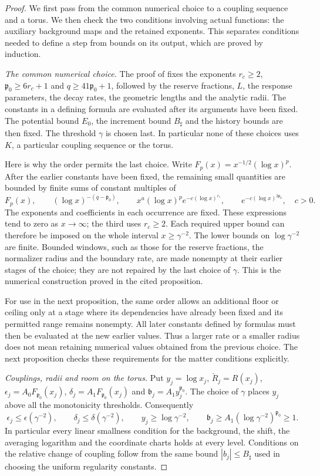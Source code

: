 \documentclass[11pt,letterpaper,reqno]{amsart}
\theoremstyle{definition}
\theoremstyle{remark}
\begin{document}
\begin{proof}
We first pass from the common numerical choice to a coupling
sequence and a torus. We then check the two conditions involving
actual functions: the auxiliary background maps and the retained
exponents. This separates conditions needed to define a step from
bounds on its output, which are proved by induction.

\emph{The common numerical choice.}
The proof of \cite[Prop.~4.163]{YMM1} fixes the exponents
$r_c\ge2$, $\mathfrak p_0\ge6r_c+1$ and
$q\ge41\mathfrak p_0+1$, followed by the reserve fractions,
$L$, the response parameters, the decay rates, the geometric
lengths and the analytic radii. The constants in a defining formula
are evaluated after its arguments have been fixed. The potential
bound $E_0$, the increment bound $B_\sharp$ and the history bounds
are then fixed. The threshold $\gamma$ is chosen last. In particular
none of these choices uses $K$, a particular coupling sequence or
the torus.

Here is why the order permits the last choice. Write
$F_p(x)=x^{-1/2}(\log x)^p$. After the earlier constants have
been fixed, the remaining small quantities are bounded by finite
sums of constant multiples of
\[
 F_p(x),\qquad (\log x)^{-(q-\mathfrak p_0)},\qquad
 x^a(\log x)^p e^{-c(\log x)^{r_c}},\qquad
 e^{-c(\log x)^{2\mathfrak p_0}},
 \quad c>0.
\]
The exponents and coefficients in each occurrence are fixed.
These expressions tend to zero as $x\to\infty$; the third uses
$r_c\ge2$. Each required upper bound can therefore be imposed on
the whole interval $x\ge\gamma^{-2}$. The lower bounds on
$\log\gamma^{-2}$ are finite. Bounded windows, such as those for
the reserve fractions, the normalizer radius and the boundary
rate, are made nonempty at their earlier stages of the choice;
they are not repaired by the last choice of $\gamma$.
This is the numerical construction proved in the cited proposition.

For use in the next proposition, the same order allows an additional
floor or ceiling only at a stage where its dependencies have already
been fixed and its permitted range remains nonempty. All later
constants defined by formulas must then be evaluated at the new
earlier values. Thus a larger rate or a smaller radius does not
mean retaining numerical values obtained from the previous choice.
The next proposition checks these requirements for the matter
conditions explicitly.

\emph{Couplings, radii and room on the torus.}
Put $y_j=\log x_j$, $\check R_j=R(x_j)$,
$\epsilon_j=A_0F_{\mathfrak p_0}(x_j)$,
$\delta_j=A_1F_{\mathfrak p_0}(x_j)$ and
$\mathfrak b_j=A_1y_j^{\mathfrak p_0}$. The choice of $\gamma$
places $y_j$ above all the monotonicity thresholds. Consequently
\[
 \epsilon_j\le\epsilon(\gamma^{-2}),\qquad
 \delta_j\le\delta(\gamma^{-2}),\qquad
 y_j\ge\log\gamma^{-2},\qquad
 \mathfrak b_j\ge A_1(\log\gamma^{-2})^{\mathfrak p_0}\ge1.
\]
In particular every linear smallness condition for the background,
the shift, the averaging logarithm and the coordinate charts holds
at every level. Conditions on the relative change of coupling
follow from the same bound $|b_j|\le B_\sharp$ used in choosing
the uniform regularity constants.


\end{proof}
\end{document}
